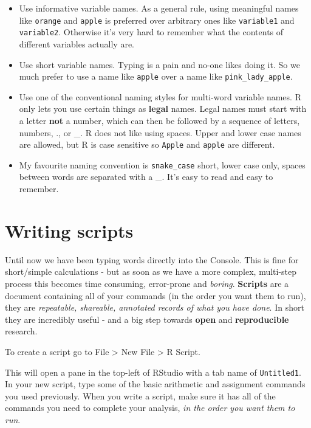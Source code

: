 \documentclass[
]{book}
\begin{document}
\begin{itemize}
\item
  Use informative variable names. As a general rule, using meaningful names like \texttt{orange} and \texttt{apple} is preferred over arbitrary ones like \texttt{variable1} and \texttt{variable2}. Otherwise it's very hard to remember what the contents of different variables actually are.
\item
  Use short variable names. Typing is a pain and no-one likes doing it. So we much prefer to use a name like \texttt{apple} over a name like \texttt{pink\_lady\_apple}.
\item
  Use one of the conventional naming styles for multi-word variable names. R only lets you use certain things as \textbf{legal} names. Legal names must start with a letter \textbf{not} a number, which can then be followed by a sequence of letters, numbers, ., or \_. R does not like using spaces. Upper and lower case names are allowed, but R is case sensitive so \texttt{Apple} and \texttt{apple} are different.
\item
  My favourite naming convention is \texttt{snake\_case} short, lower case only, spaces between words are separated with a \_. It's easy to read and easy to remember.
\end{itemize}

\hypertarget{writing-scripts}{%
\section{Writing scripts}\label{writing-scripts}}

Until now we have been typing words directly into the Console. This is fine for short/simple calculations - but as soon as we have a more complex, multi-step process this becomes time consuming, error-prone and \emph{boring}. \textbf{Scripts} are a document containing all of your commands (in the order you want them to run), they are \emph{repeatable, shareable, annotated records of what you have done}. In short they are incredibly useful - and a big step towards \textbf{open} and \textbf{reproducible} research.

To create a script go to File \textgreater{} New File \textgreater{} R Script.

This will open a pane in the top-left of RStudio with a tab name of \texttt{Untitled1}. In your new script, type some of the basic arithmetic and assignment commands you used previously. When you write a script, make sure it has all of the commands you need to complete your analysis, \emph{in the order you want them to run}.
\end{document}
